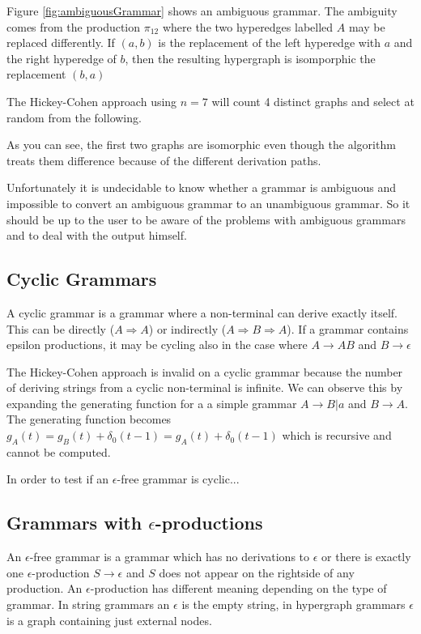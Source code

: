

Figure \ref{fig:ambiguousGrammar} shows an ambiguous grammar. The ambiguity comes from the production $\pi_{12}$ where the two hyperedges labelled $A$ may be replaced differently. If $(a,b)$ is the replacement of the left hyperedge with $a$ and the right hyperedge of $b$, then the resulting hypergraph is isomporphic the replacement $(b, a)$

The Hickey-Cohen approach using $n=7$ will count 4 distinct graphs and select at random from the following.



As you can see, the first two graphs are isomorphic even though the algorithm treats them difference because of the different derivation paths.

Unfortunately it is undecidable to know whether a grammar is ambiguous and impossible to convert an ambiguous grammar to an unambiguous grammar. So it should be up to the user to be aware of the problems with ambiguous grammars and to deal with the output himself.

\subsection{Cyclic Grammars}

A cyclic grammar is a grammar where a non-terminal can derive exactly itself. This can be directly ($A \Rightarrow A$) or indirectly ($A \Rightarrow B \Rightarrow A$). If a grammar contains epsilon productions, it may be cycling also in the case where $A \to AB$ and $B \to \epsilon$

The Hickey-Cohen approach is invalid on a cyclic grammar because the number of deriving strings from a cyclic non-terminal is infinite. We can observe this by expanding the generating function for a a simple grammar $A \to B | a$ and $B \to A$. The generating function becomes $g_A(t) = g_B(t) + \delta_0(t-1) = g_A(t) + \delta_0(t-1)$ which is recursive and cannot be computed.

In order to test if an $\epsilon$-free grammar is cyclic...

\subsection{Grammars with $\epsilon$-productions}

An $\epsilon$-free grammar is a grammar which has no derivations to $\epsilon$ or there is exactly one $\epsilon$-production $S \to \epsilon$ and $S$ does not appear on the rightside of any production. An $\epsilon$-production has different meaning depending on the type of grammar. In string grammars an $\epsilon$ is the empty string, in hypergraph grammars $\epsilon$ is a graph containing just external nodes.

